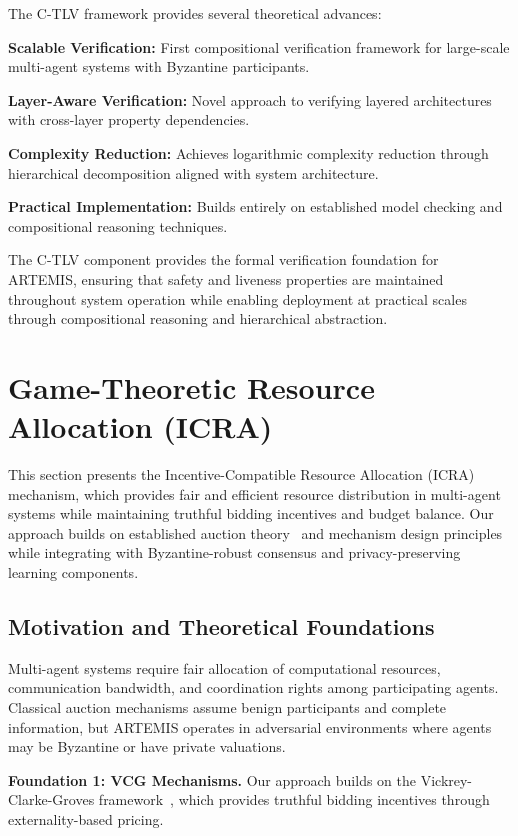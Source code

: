 \documentclass[conference]{IEEEtran}
\begin{document}
The C-TLV framework provides several theoretical advances:

\textbf{Scalable Verification:} First compositional verification framework for large-scale multi-agent systems with Byzantine participants.

\textbf{Layer-Aware Verification:} Novel approach to verifying layered architectures with cross-layer property dependencies.

\textbf{Complexity Reduction:} Achieves logarithmic complexity reduction through hierarchical decomposition aligned with system architecture.

\textbf{Practical Implementation:} Builds entirely on established model checking and compositional reasoning techniques.

The C-TLV component provides the formal verification foundation for ARTEMIS, ensuring that safety and liveness properties are maintained throughout system operation while enabling deployment at practical scales through compositional reasoning and hierarchical abstraction.

\section{Game-Theoretic Resource Allocation (ICRA)}

This section presents the Incentive-Compatible Resource Allocation (ICRA) mechanism, which provides fair and efficient resource distribution in multi-agent systems while maintaining truthful bidding incentives and budget balance. Our approach builds on established auction theory~\cite{vickrey1961counterspeculation} and mechanism design principles~\cite{myerson1991game} while integrating with Byzantine-robust consensus and privacy-preserving learning components.

\subsection{Motivation and Theoretical Foundations}

Multi-agent systems require fair allocation of computational resources, communication bandwidth, and coordination rights among participating agents. Classical auction mechanisms assume benign participants and complete information, but ARTEMIS operates in adversarial environments where agents may be Byzantine or have private valuations.

\textbf{Foundation 1: VCG Mechanisms.} Our approach builds on the Vickrey-Clarke-Groves framework~\cite{vickrey1961counterspeculation}, which provides truthful bidding incentives through externality-based pricing.
\end{document}
